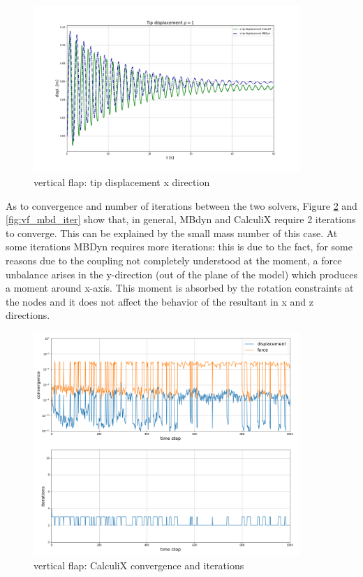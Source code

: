 \begin{figure}[htbp!]
	\centering
	\includegraphics[width=0.9\textwidth]{images/vert_flap/disp_rho1.png}
	\caption{vertical flap: tip displacement x direction}
	\label{fig:vf_displacement}
\end{figure}


As to convergence and number of iterations between the two solvers, Figure \ref{fig:vf_cx_iter} and \ref{fig:vf_mbd_iter} show that, in general, MBdyn and CalculiX require 2 iterations to converge. This can be explained by the small mass number of this case. At some iterations MBDyn requires more iterations: this is due to the fact, for some reasons due to the coupling not completely understood at the moment, a force unbalance arises in the y-direction (out of the plane of the model) which produces a moment around x-axis. This moment is absorbed by the rotation constraints at the nodes and it does not affect the behavior of the resultant in x and z directions. 

\begin{figure}[htbp!]
	\centering
	\includegraphics[width=0.9\textwidth]{images/vert_flap/CX_iterations_rho1.png}
	\caption{vertical flap: CalculiX convergence and iterations}
	\label{fig:vf_cx_iter}
\end{figure}


